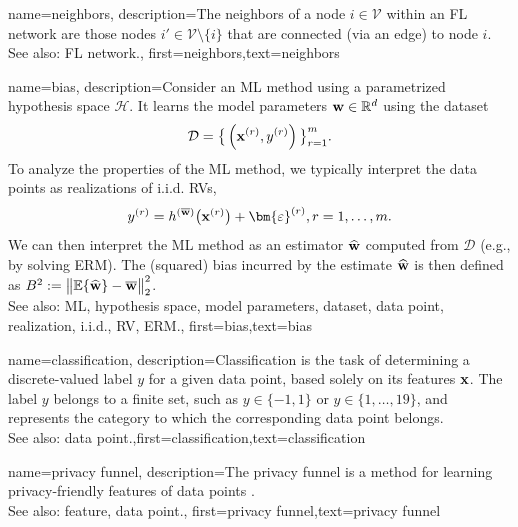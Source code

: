 {
	name={neighbors},
	description={The neighbors of a node $i \in \mathcal{V}$ 
	within an FL network are those nodes $i' \in \mathcal{V} \setminus \{ i\}$ that are connected (via an edge) to node $i$.
				\\ 
		See also: FL network.},
	first={neighbors},text={neighbors} 
}

{
	name={bias},
	description={Consider an ML method using a parametrized hypothesis space $\mathcal{H}$. 
		It learns the model parameters ${\bf w} \in \mathbb{R}^{d}$ using the dataset $$ \mathcal{D}=\big\{ \left( {\bf x}^{(r)},y^{(r)} \right) \big\}_{r=1}^{m}.$$ 
		To analyze the properties of the ML method, we typically interpret the data points as realizations 
		of i.i.d. RVs, $$ y^{(r)} = h^{(\overline{{\bf w}})}\big( {\bf x}^{(r)} \big) + \bm{\varepsilon}^{(r)}, r=1,\ldots,m.$$ 
		We can then interpret the ML method as an estimator $\widehat{{\bf w}}$ 
		computed from $\mathcal{D}$ (e.g., by solving ERM). The (squared) bias incurred by the estimate $\widehat{{\bf w}}$ 
		is then defined as $B^{2} := \big\| \mathbb{E}  \{ \widehat{{\bf w}}  \}- \overline{{\bf w}}\big\|_{2}^{2}$.
					\\ 
		See also: ML, hypothesis space, model parameters, dataset, data point, realization, i.i.d., RV, ERM.},
first={bias},text={bias} 
}

{name={classification},
 description={Classification is the task of determining a 
 	discrete-valued label $y$ for a given data point, based solely on its 
 	features ${\bf x}$. The label $y$ belongs to a finite set, such as 
 	$y \in \{-1,1\}$ or $y \in \{1,\ldots,19\}$, and represents the 
 	category to which the corresponding data point belongs.
				\\ 
		See also: data point.},first={classification},text={classification} 
}



{name={privacy funnel},
 description={The privacy funnel is a method for learning privacy-friendly features 
	of data points \cite{PrivacyFunnel}.
				\\ 
		See also: feature, data point.},
 first={privacy funnel},text={privacy funnel} 
}




